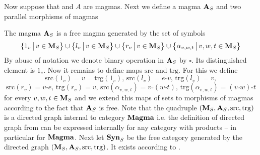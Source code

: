 Now suppose that and $A$ are magmas. Next we define a magma $\mathbf{A}_S$ and two
parallel morphisms of magmas
\begin{center}
\end{center}
The magma $\mathbf{A}_S$ is a free magma generated by the set of symbols
$$\{1_v\,\big|\,v\in \mathbf{M}_S\big\} \cup \big\{l_v\,\big|\,v\in \mathbf{M}_S\big\}\cup \big\{r_v\,\big|\,v\in \mathbf{M}_S\big\}\cup \big\{\alpha_{v,w,t}\,\big|\,v,w,t\in \mathbf{M}_S\big\}$$
By abuse of notation we denote binary operation in $\mathbf{A}_S$ by $\square$. Its distinguished element is $1_e$. Now it remains to define maps  $\mathrm{src}$ and $\mathrm{trg}$. For this we define
$$\mathrm{src}(1_v) = v = \mathrm{trg}(1_v),\,\mathrm{src}(l_v) = e\square v,\,\mathrm{trg}(l_v) = v,$$
$$\mathrm{src}(r_v) = v\square e,\,\mathrm{trg}(r_v) = v,\,\mathrm{src}(\alpha_{v,w,t})=v\square(w\square t),\,\mathrm{trg}(\alpha_{v,w,t})=(v\square w)\square t $$
for every $v,w,t\in \mathbf{M}_S$ and we extend this maps of sets to morphisms of magmas according to the fact that $\mathbf{A}_S$ is free. Note that the quadruple $\left(\mathbf{M}_S,\mathbf{A}_S,\mathrm{src},\mathrm{trg}\right)$ is a directed graph internal to category $\mathbf{Magma}$ i.e. the definition of directed graph from {\cite[page 10]{Maclane}} can be expressed internally for any category with products -- in particular for $\mathbf{Magma}$. Next let $\mathbf{Syn}_{S}$ be the free category generated by the directed graph $\left(\mathbf{M}_S,\mathbf{A}_S,\mathrm{src},\mathrm{trg}\right)$. It exists according to {\cite[page 49, Theorem 1]{Maclane}}.

